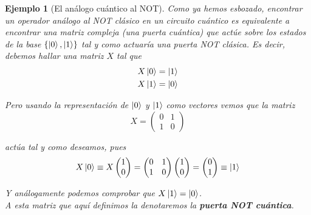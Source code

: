 \documentclass[11pt, spanish]{report}
\numberwithin{equation}{section}
\newtheorem{ejs}[defin]{Ejemplo}
\numberwithin{defin}{section}
\begin{document}
\begin{ejs}[El análogo cuántico al NOT] Como ya hemos esbozado, encontrar un operador análogo al NOT clásico en un circuito cuántico es equivalente a encontrar una matriz compleja (una puerta cuántica) que actúe sobre los estados de la base $\{\ket{0},\ket{1}\}$ tal y como actuaría una puerta NOT clásica. Es decir, debemos hallar una matriz $X$ tal que
\begin{equation}
\begin{split}
X\ket{0}=\ket{1}\\
X\ket{1}=\ket{0}
\end{split}
\end{equation}

Pero usando la representación de $\ket{0}$ y $\ket{1}$ como vectores vemos que la matriz
\begin{equation}
X=\begin{pmatrix}
0 & 1\\
1& 0
\end{pmatrix}
\end{equation}

\noindent actúa tal y como deseamos, pues \begin{equation}
X\ket{0}\equiv X\begin{pmatrix} 1 \\ 0 \end{pmatrix}=\begin{pmatrix}0 & 1\\ 1& 0\end{pmatrix}\begin{pmatrix} 1 \\ 0 \end{pmatrix}=\begin{pmatrix}
0 \\ 1
\end{pmatrix}\equiv\ket{1}
\end{equation}

Y análogamente podemos comprobar que $X\ket{1}=\ket{0}$.\\

A esta matriz que aquí definimos la denotaremos la\footnotemark{} \textbf{puerta NOT cuántica}.

\end{ejs}

\end{document}
